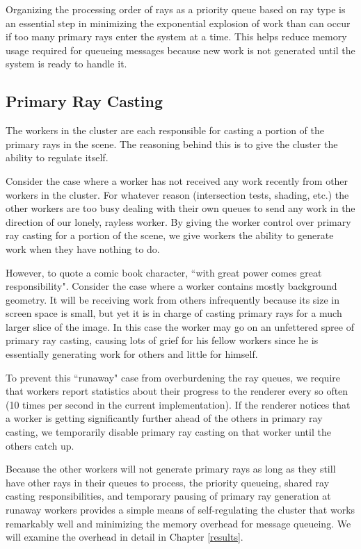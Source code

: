 \documentclass[12pt]{ucthesis}
\begin{document}
Organizing the processing order of rays as a priority queue based on ray type
is an essential step in minimizing the exponential explosion of work than can
occur if too many primary rays enter the system at a time. This helps reduce
memory usage required for queueing messages because new work is not generated
until the system is ready to handle it.

\subsection{Primary Ray Casting}
\label{primaryrays}

The workers in the cluster are each responsible for casting a portion of the
primary rays in the scene. The reasoning behind this is to give the cluster
the ability to regulate itself.

Consider the case where a worker has not received any work recently from other
workers in the cluster. For whatever reason (intersection tests, shading, etc.)
the other workers are too busy dealing with their own queues to send any work
in the direction of our lonely, rayless worker. By giving the worker control
over primary ray casting for a portion of the scene, we give workers the ability
to generate work when they have nothing to do.

However, to quote a comic book character, ``with great power comes great
responsibility". Consider the case where a worker contains mostly background
geometry. It will be receiving work from others infrequently because its size
in screen space is small, but yet it is in charge of casting primary rays for
a much larger slice of the image. In this case the worker may go on an
unfettered spree of primary ray casting, causing lots of grief for his fellow
workers since he is essentially generating work for others and little for
himself.

To prevent this ``runaway" case from overburdening the ray queues, we require
that workers report statistics about their progress to the renderer every so
often (10 times per second in the current implementation). If the renderer
notices that a worker is getting significantly further ahead of the others in
primary ray casting, we temporarily disable primary ray casting on that worker
until the others catch up.

Because the other workers will not generate primary rays as long as they still
have other rays in their queues to process, the priority queueing, shared
ray casting responsibilities, and temporary pausing of primary ray generation at
runaway workers provides a simple means of self-regulating the cluster that
works remarkably well and minimizing the memory overhead for message queueing.
We will examine the overhead in detail in Chapter \ref{results}.
\end{document}
